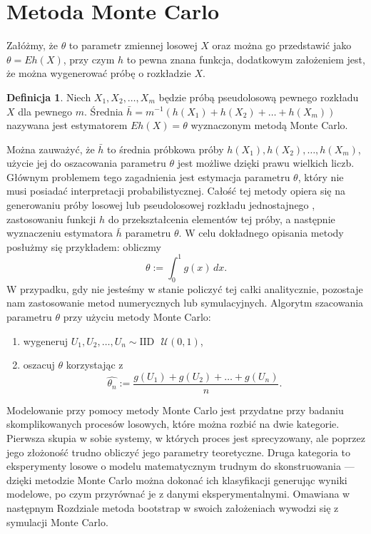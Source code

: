 \documentclass[inzynierska]{pwr_wmat_praca_dyplomowa}
\theoremstyle{plain}
\numberwithin{theorem}{chapter}
\theoremstyle{definition}
\numberwithin{theorem}{chapter}
\newtheorem{definition}[theorem]{Definicja}
\begin{document}
\section{Metoda Monte Carlo}
Załóżmy, że $\theta$ to parametr zmiennej losowej $X$ oraz można go przedstawić jako $\theta=Eh(X)$, przy czym $h$ to pewna znana funkcja, dodatkowym założeniem jest, że można wygenerować próbę o rozkładzie $X$. 
\begin{definition}
	Niech $X_1,X_2,\dots,X_m$ będzie próbą pseudolosową pewnego rozkładu $X$ dla pewnego $m$. Średnia $\bar{h}=m^{-1}(h(X_1)+h(X_2)+\dots +h(X_m))$ nazywana jest estymatorem $Eh(X)=\theta$ wyznaczonym metodą Monte Carlo.
\end{definition}
Można zauważyć, że $\bar{h}$ to średnia próbkowa próby $h(X_1),h(X_2),\dots ,h(X_m)$, użycie jej do oszacowania parametru $\theta$ jest możliwe dzięki prawu wielkich liczb. Głównym problemem tego zagadnienia jest estymacja parametru $\theta$, który nie musi posiadać interpretacji probabilistycznej. Całość tej metody opiera się na generowaniu próby losowej lub pseudolosowej rozkładu jednostajnego , zastosowaniu funkcji $h$ do przekształcenia elementów tej próby, a następnie wyznaczeniu estymatora $\bar{h}$ parametru $\theta$. 
W celu dokładnego opisania metody posłużmy się przykładem: obliczmy
\begin{equation}
	\theta:=\int_{0}^{1}g(x)\,dx.
\end{equation}
W przypadku, gdy nie jesteśmy w stanie policzyć tej całki analitycznie, pozostaje nam zastosowanie metod numerycznych lub symulacyjnych. Algorytm szacowania parametru $\theta$ przy użyciu metody Monte Carlo:
\begin{enumerate}
	\item wygeneruj $U_1,U_2,\dots, U_n \sim \text{IID}\,\,\,\, \mathcal{U}(0,1)$,
	\item oszacuj $\theta$ korzystając z
	\begin{equation}
		\hat{\theta_n}:= \frac{g(U_1)+g(U_2)+\dots+g(U_n)}{n}.
	\end{equation}
\end{enumerate} 

Modelowanie przy pomocy metody Monte Carlo jest przydatne przy badaniu skomplikowanych procesów losowych, które można rozbić na dwie kategorie. Pierwsza skupia w sobie systemy, w których proces jest sprecyzowany, ale poprzez jego złożoność trudno obliczyć jego parametry teoretyczne. Druga kategoria to eksperymenty losowe o modelu matematycznym trudnym do skonstruowania --- dzięki metodzie Monte Carlo można dokonać ich klasyfikacji generując wyniki modelowe, po czym przyrównać je z danymi eksperymentalnymi. Omawiana w następnym Rozdziale metoda bootstrap w swoich założeniach wywodzi się z symulacji Monte Carlo.
\end{document}
